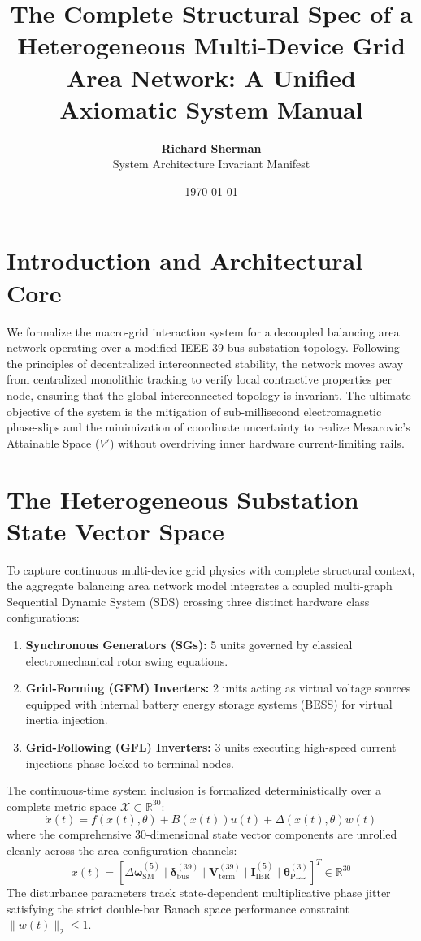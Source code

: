 \documentclass[11pt,fleqn]{article}
\title{\textbf{The Complete Structural Spec of a Heterogeneous Multi-Device Grid Area Network: A Unified Axiomatic System Manual}}
\author{\textbf{Richard Sherman} \\ System Architecture Invariant Manifest}
\date{\today}
\begin{document}
\maketitle

\section{Introduction and Architectural Core}
We formalize the macro-grid interaction system for a decoupled balancing area network operating over a modified IEEE 39-bus substation topology. Following the principles of decentralized interconnected stability, the network moves away from centralized monolithic tracking to verify local contractive properties per node, ensuring that the global interconnected topology is invariant. The ultimate objective of the system is the mitigation of sub-millisecond electromagnetic phase-slips and the minimization of coordinate uncertainty to realize Mesarovic's Attainable Space ($V'$) without overdriving inner hardware current-limiting rails.

\section{The Heterogeneous Substation State Vector Space}
To capture continuous multi-device grid physics with complete structural context, the aggregate balancing area network model integrates a coupled multi-graph Sequential Dynamic System (SDS) crossing three distinct hardware class configurations:
\begin{enumerate}
    \item \textbf{Synchronous Generators (SGs):} 5 units governed by classical electromechanical rotor swing equations.
    \item \textbf{Grid-Forming (GFM) Inverters:} 2 units acting as virtual voltage sources equipped with internal battery energy storage systems (BESS) for virtual inertia injection.
    \item \textbf{Grid-Following (GFL) Inverters:} 3 units executing high-speed current injections phase-locked to terminal nodes.
\end{enumerate}

The continuous-time system inclusion is formalized deterministically over a complete metric space $\mathcal{X} \subset \mathbb{R}^{30}$:
\begin{equation}
    \dot{x}(t) = f(x(t), \theta) + B(x(t))u(t) + \Delta(x(t), \theta)w(t)
\end{equation}
where the comprehensive 30-dimensional state vector components are unrolled cleanly across the area configuration channels:
\begin{equation}
    x(t) = \left[ \Delta \bm{\omega}_{\text{SM}}^{(5)} \mid \bm{\delta}_{\text{bus}}^{(39)} \mid \bm{V}_{\text{term}}^{(39)} \mid \bm{I}_{\text{IBR}}^{(5)} \mid \bm{\theta}_{\text{PLL}}^{(3)} \right]^T \in \mathbb{R}^{30}
\end{equation}
The disturbance parameters track state-dependent multiplicative phase jitter satisfying the strict double-bar Banach space performance constraint $\|w(t)\|_2 \le 1$.
\end{document}
